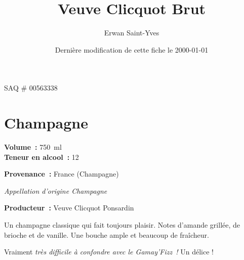 
    \date{Dernière modification de cette fiche
    le 2000-01-01}
\author{Erwan Saint-Yves}
\title{Veuve Clicquot Brut}
\maketitle

\begin{center}

SAQ # 00563338

\end{center}

\hr

\section*{Champagne}

{\bf \large Volume :}
      750 ml \\
{\bf \large Teneur en alcool :}
      12%
    

{\bf \large Provenance :}
      France (Champagne)

{\em Appellation d'origine Champagne}

  

{\bf \large Producteur :} Veuve Clicquot Ponsardin

Un champagne classique qui fait toujours plaisir. Notes d’amande grillée, de
      brioche et de vanille. Une bouche ample et beaucoup de fraîcheur.



Vraiment {\em très difficile à confondre avec le {\em Gamay'Fizz} !} Un délice !



  
